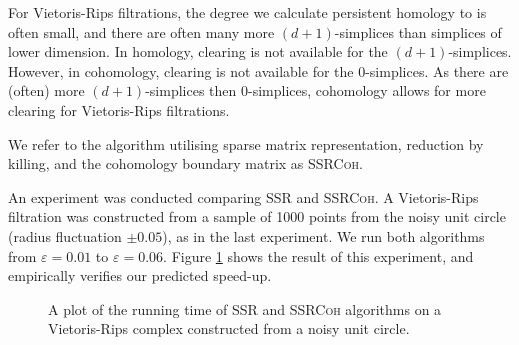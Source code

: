 For Vietoris-Rips filtrations, the degree we calculate persistent homology to is often small, and there are often many more $(d+1)$-simplices than simplices of lower dimension. In homology, clearing is not available for the $(d+1)$-simplices. However, in cohomology, clearing is not available for the $0$-simplices. As there are (often) more $(d+1)$-simplices then $0$-simplices, cohomology allows for more clearing for Vietoris-Rips filtrations.

We refer to the algorithm utilising sparse matrix representation, reduction by killing, and the cohomology boundary matrix as \textsc{SSRCoh}. 

An experiment was conducted comparing \textsc{SSR} and \textsc{SSRCoh}. A Vietoris-Rips filtration was constructed from a sample of 1000 points from the noisy unit circle (radius fluctuation $\pm 0.05$), as in the last experiment. We run both algorithms from $\varepsilon = 0.01$ to $\varepsilon = 0.06$. Figure \ref{fig:speedsup-3v4} shows the result of this experiment, and empirically verifies our predicted speed-up.

\begin{figure}
  \caption{A plot of the running time of \textsc{SSR} and \textsc{SSRCoh} algorithms on a Vietoris-Rips complex constructed from a noisy unit circle.}
  \label{fig:speedsup-3v4}
\end{figure}
